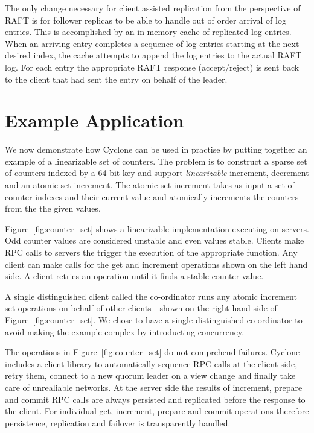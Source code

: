 \documentclass[twocolumn]{article}
\begin{document}
The only change necessary for client assisted replication from the perspective
of RAFT is for follower replicas to be able to handle out of order arrival of
log entries. This is accomplished by an in memory cache of replicated log
entries. When an arriving entry completes a sequence of log entries starting at
the next desired index, the cache attempts to append the log entries to the
actual RAFT log. For each entry the appropriate RAFT response (accept/reject) is
sent back to the client that had sent the entry on behalf of the leader.

\section{Example Application}
\label{sec:examples}
We now demonstrate how Cyclone can be used in practise by putting together an
example of a linearizable set of counters. The problem is to construct a sparse
set of counters indexed by a 64 bit key and support \emph{linearizable}
increment, decrement and an atomic set increment. The atomic set increment takes
as input a set of counter indexes and their current value and atomically
increments the counters from the the given values. 

Figure~\ref{fig:counter_set} shows a linearizable implementation executing on
servers. Odd counter values are considered unstable and even values stable.
Clients make RPC calls to servers the trigger the execution of the
appropriate function. Any client can make calls for the get and increment
operations shown on the left hand side. A client retries an operation until it
finds a stable counter value.

A single distinguished client called the co-ordinator runs any atomic increment
set operations on behalf of other clients - shown on the right hand side of
Figure~\ref{fig:counter_set}. We chose to have a single
distinguished co-ordinator to avoid making the example complex by introducting
concurrency.

The operations in Figure~\ref{fig:counter_set} do not comprehend failures.
Cyclone includes a client library to automatically sequence RPC calls at the client
side, retry them, connect to a new quorum leader on a view change and finally
take care of unrealiable networks. At the server side the results of increment,
prepare and commit RPC calls are always persisted and replicated before the
response to the client. For individual get, increment, prepare and commit
operations therefore persistence, replication and failover is transparently
handled.
\end{document}
